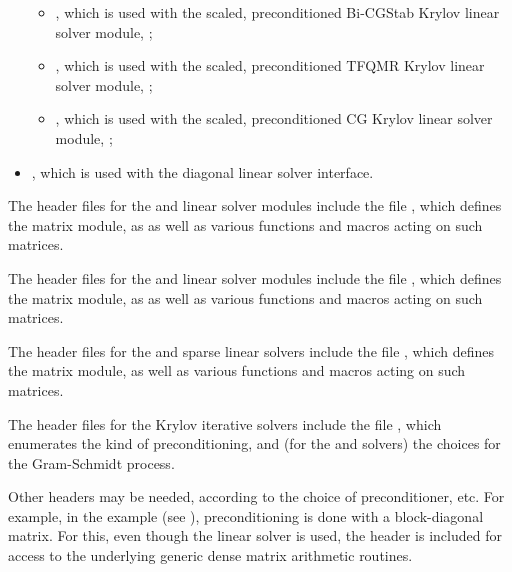 \begin{itemize}
\begin{itemize}
  \item {},
    which is used with the scaled, preconditioned Bi-CGStab Krylov
    linear solver module, {\sunlinsolspbcgs};

  \item {},
    which is used with the scaled, preconditioned TFQMR Krylov linear
    solver module, {\sunlinsolsptfqmr};

  \item {},
    which is used with the scaled, preconditioned CG Krylov linear
    solver module, {\sunlinsolpcg};
  \end{itemize}
\item {},
  which is used with the {\cvdiag} diagonal linear solver interface.
\end{itemize}

The header files for the {\sunlinsoldense} and {\sunlinsollapdense}
linear solver modules include the file
, which defines the {\sunmatdense}
matrix module, as as well as various functions and macros acting on
such matrices.

The header files for the {\sunlinsolband} and {\sunlinsollapband}
linear solver modules include the file
, which defines the {\sunmatband}
matrix module, as as well as various functions and macros acting on
such matrices.

The header files for the {\sunlinsolklu} and {\sunlinsolslumt}
sparse linear solvers include the file
, which defines the {\sunmatsparse}
matrix module, as well as various functions and macros acting on such
matrices.

The header files for the Krylov iterative solvers include the file
, which enumerates the kind of
preconditioning, and (for the {\spgmr} and {\spfgmr} solvers) the
choices for the Gram-Schmidt process.

Other headers may be needed, according to the choice of
preconditioner, etc.  For example, in the 
example (see \cite{cvode_ex}), preconditioning is done with a
block-diagonal matrix. For this, even though the {\sunlinsolspgmr}
linear solver is used, the header  is
included for access to the underlying generic dense matrix arithmetic
routines.

